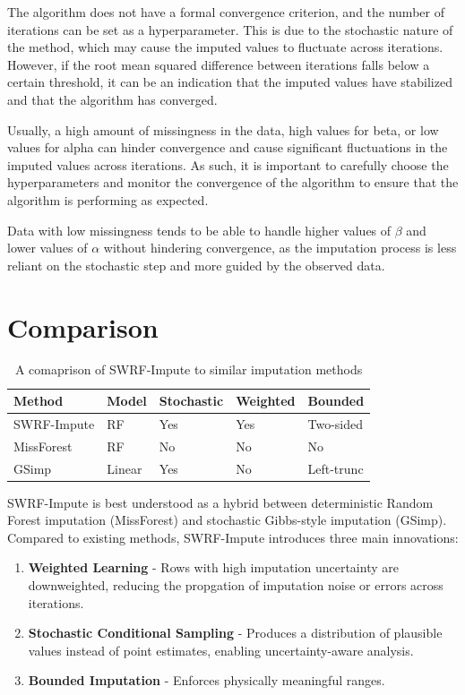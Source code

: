 \documentclass[preprint]{aastex631}
\begin{document}
The algorithm does not have a formal convergence criterion, and the number of iterations can be set as a hyperparameter. This is due to the stochastic nature of the method, which may cause the imputed values to fluctuate across iterations. However, if the root mean squared difference between iterations falls below a certain threshold, it can be an indication that the imputed values have stabilized and that the algorithm has converged.

Usually, a high amount of missingness in the data, high values for beta, or low values for alpha can hinder convergence and cause significant fluctuations in the imputed values across iterations. As such, it is important to carefully choose the hyperparameters and monitor the convergence of the algorithm to ensure that the algorithm is performing as expected.

Data with low missingness tends to be able to handle higher values of $\beta$ and lower values of $\alpha$ without hindering convergence, as the imputation process is less reliant on the stochastic step and more guided by the observed data.

\section{Comparison}

\begin{table}
  \centering
  \begin{tabular}{lllll}
    \hline
    \textbf{Method} & \textbf{Model} & \textbf{Stochastic} & \textbf{Weighted} & \textbf{Bounded} \\
    \hline
    SWRF-Impute & RF & Yes & Yes & Two-sided \\
    MissForest & RF & No & No & No \\
    GSimp & Linear & Yes & No & Left-trunc \\
  \end{tabular}
  \caption{A comaprison of SWRF-Impute to similar imputation methods}
  \label{tab:comparison}
\end{table}

SWRF-Impute is best understood as a hybrid between deterministic Random Forest imputation (MissForest) and stochastic Gibbs-style imputation (GSimp). Compared to existing methods, SWRF-Impute introduces three main innovations:

\begin{enumerate}
  \item \textbf{Weighted Learning} - Rows with high imputation uncertainty are downweighted, reducing the propgation of imputation noise or errors across iterations.
  \item \textbf{Stochastic Conditional Sampling} - Produces a distribution of plausible values instead of point estimates, enabling uncertainty-aware analysis.
  \item \textbf{Bounded Imputation} - Enforces physically meaningful ranges.
\end{enumerate}
\end{document}
